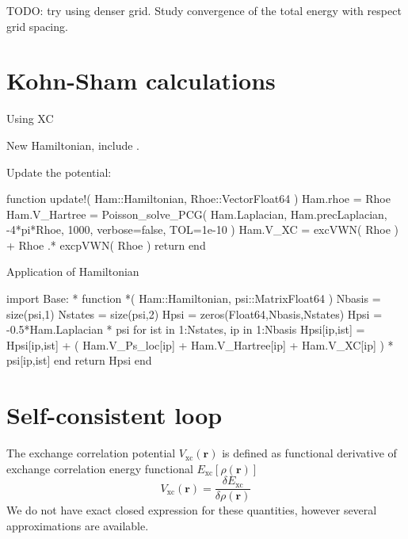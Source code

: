 TODO: try using denser grid. Study convergence of the total energy with respect
grid spacing.




\section{Kohn-Sham calculations}

Using XC

New Hamiltonian, include .

Update the potential:

\begin{juliacode}
function update!( Ham::Hamiltonian, Rhoe::Vector{Float64} )
  Ham.rhoe = Rhoe
  Ham.V_Hartree = Poisson_solve_PCG( Ham.Laplacian, Ham.precLaplacian,
    -4*pi*Rhoe, 1000, verbose=false, TOL=1e-10 )
  Ham.V_XC = excVWN( Rhoe ) + Rhoe .* excpVWN( Rhoe )
  return
end
\end{juliacode}

Application of Hamiltonian

\begin{juliacode}
import Base: *
function *( Ham::Hamiltonian, psi::Matrix{Float64} )
  Nbasis = size(psi,1)
  Nstates = size(psi,2)
  Hpsi = zeros(Float64,Nbasis,Nstates)
  Hpsi = -0.5*Ham.Laplacian * psi
  for ist in 1:Nstates, ip in 1:Nbasis
    Hpsi[ip,ist] = Hpsi[ip,ist] + ( Ham.V_Ps_loc[ip] + Ham.V_Hartree[ip] +
                   Ham.V_XC[ip] ) * psi[ip,ist]
  end
  return Hpsi
end
\end{juliacode}

\section{Self-consistent loop}

The exchange correlation potential $V_{\mathrm{xc}}(\mathbf{r})$
is defined as functional derivative of
exchange correlation energy functional $E_{\mathrm{xc}}[\rho(\mathbf{r})]$
\begin{equation}
V_{\mathrm{xc}}(\mathbf{r}) = \frac{\delta E_{\mathrm{xc}}}{\delta \rho(\mathbf{r})}
\end{equation}
We do not have exact closed expression for these quantities, however several
approximations are available.